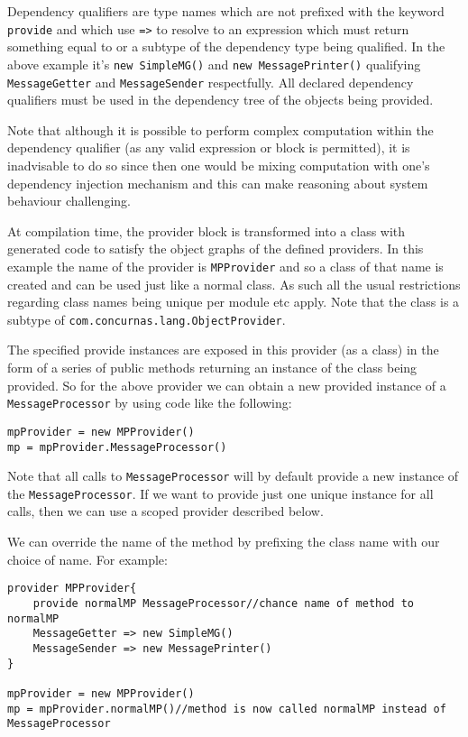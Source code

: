 \documentclass[conc-doc]{subfiles}
\begin{document}
Dependency qualifiers are type names which are not prefixed with the keyword \lstinline{provide} and which use \lstinline{=>} to resolve to an expression which must return something equal to or a subtype of the dependency type being qualified. In the above example it's \lstinline{new SimpleMG()} and \lstinline{new MessagePrinter()} qualifying  \lstinline{MessageGetter} and \lstinline{MessageSender} respectfully. All declared dependency qualifiers must be used in the dependency tree of the objects being provided.

Note that although it is possible to perform complex computation within the dependency qualifier (as any valid expression or block is permitted), it is inadvisable to do so since then one would be mixing computation with one's dependency injection mechanism and this can make reasoning about system behaviour challenging.

At compilation time, the provider block is transformed into a class with generated code to satisfy the object graphs of the defined providers. In this example the name of the provider is \lstinline{MPProvider} and so a class of that name is created and can be used just like a normal class. As such all the usual restrictions regarding class names being unique per module etc apply. Note that the class is a subtype of \lstinline{com.concurnas.lang.ObjectProvider}.

The specified provide instances are exposed in this provider (as a class) in the form of a series of public methods returning an instance of the class being provided. So for the above provider we can obtain a new provided instance of a \lstinline{MessageProcessor} by using code like the following:

\begin{lstlisting}
mpProvider = new MPProvider()
mp = mpProvider.MessageProcessor()
\end{lstlisting}

Note that all calls to \lstinline{MessageProcessor} will by default provide a new instance of the \lstinline{MessageProcessor}. If we want to provide just one unique instance for all calls, then we can use a scoped provider described below.

We can override the name of the method by prefixing the class name with our choice of name. For example:

\begin{lstlisting}
provider MPProvider{
	provide normalMP MessageProcessor//chance name of method to normalMP 
	MessageGetter => new SimpleMG()
	MessageSender => new MessagePrinter()
}

mpProvider = new MPProvider()
mp = mpProvider.normalMP()//method is now called normalMP instead of MessageProcessor
\end{lstlisting}
\end{document}
